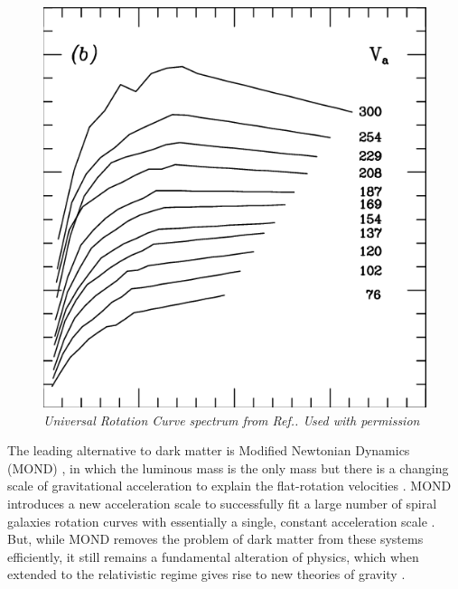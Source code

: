 \documentclass[reprint,%
 amsmath,amssymb,
 aps,
]{revtex4-1}
\begin{document}
 
   
 \begin{figure}[h!]
     \centering
     \includegraphics[width=\linewidth]{The-universal-rotation-curve-of-spiral-galaxies-at-different-luminosities-and-velocities}
     \caption{\emph{Universal Rotation Curve spectrum from Ref.\citep{salucci}. Used with permission}}
     \label{fig:URC}
\end{figure}
  

    


 
The   leading   alternative     to dark matter  is   Modified Newtonian Dynamics (MOND) \cite{Milgrom},  in which     the   luminous mass is the only mass   but  there is   a changing   scale of gravitational acceleration to explain the flat-rotation velocities  \cite{McGaugh_2014}. MOND introduces a new acceleration scale to successfully fit   a large number of spiral galaxies  rotation curves with essentially a single, constant acceleration scale \cite{2016Lelli}.   But, while MOND removes the problem of dark matter from these systems efficiently, it still remains a   fundamental  alteration of   physics, which when extended  to the relativistic regime   gives rise to  new theories of gravity  \cite{PhysRevD.70.083509,doi:10.1142/S0217751X0703666X,Famaey2012}.
\end{document}
